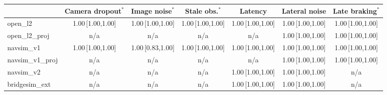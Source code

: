 \begin{tabular}{@{}lcccccc@{}}
\toprule
 & Camera dropout$^{\ast}$ & Image noise$^{\ast}$ & Stale obs.$^{\ast}$ & Latency & Lateral noise & Late braking$^{\ast}$ \\
\midrule
open\_l2 & 1.00\,{\scriptsize[1.00,1.00]} & 1.00\,{\scriptsize[1.00,1.00]} & 1.00\,{\scriptsize[1.00,1.00]} & 1.00\,{\scriptsize[1.00,1.00]} & 1.00\,{\scriptsize[1.00,1.00]} & 1.00\,{\scriptsize[1.00,1.00]} \\
open\_l2\_proj & n/a & n/a & n/a & n/a & 1.00\,{\scriptsize[1.00,1.00]} & 1.00\,{\scriptsize[1.00,1.00]} \\
navsim\_v1 & 1.00\,{\scriptsize[1.00,1.00]} & 1.00\,{\scriptsize[0.83,1.00]} & 1.00\,{\scriptsize[1.00,1.00]} & 1.00\,{\scriptsize[1.00,1.00]} & 1.00\,{\scriptsize[1.00,1.00]} & 1.00\,{\scriptsize[1.00,1.00]} \\
navsim\_v1\_proj & n/a & n/a & n/a & n/a & 1.00\,{\scriptsize[1.00,1.00]} & 1.00\,{\scriptsize[1.00,1.00]} \\
navsim\_v2 & n/a & n/a & n/a & 1.00\,{\scriptsize[1.00,1.00]} & 1.00\,{\scriptsize[1.00,1.00]} & n/a \\
bridgesim\_ext & n/a & n/a & n/a & 1.00\,{\scriptsize[1.00,1.00]} & 1.00\,{\scriptsize[1.00,1.00]} & n/a \\
\bottomrule
\end{tabular}
